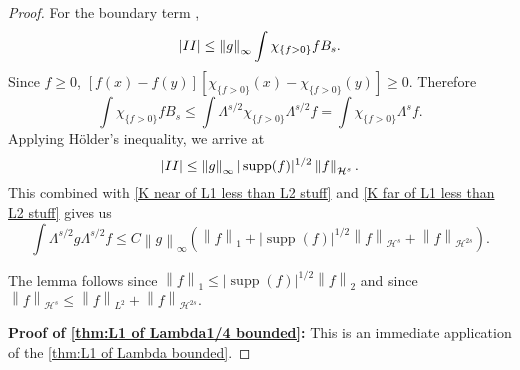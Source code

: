 \documentclass[11pt]{amsart}
\theoremstyle{remark}
\theoremstyle{definition}
\newcommand{\norm}[1]{\left\lVert#1\right\rVert}
\newcommand{\paren}[1]{\left( #1 \right)}
\newcommand{\abs}[1]{\left\lvert #1 \right\rvert}
\DeclareMathOperator{\supp}{supp}
\newcommand{\indic}[1]{\chi_{\{#1\}}}
\newcommand{\HD}{\mathcal{H}}
\newcommand{\Rom}[1]{\MakeUppercase{\romannumeral #1}}
\begin{document}
\begin{proof}
For the boundary term \Rom{2}, 
\[ \abs{\Rom{2}} \leq \norm{g}_\infty \int\indic{f>0} f B_s. \]
Since $f \geq 0$, $[f(x)-f(y)][\indic{f > 0}(x) - \indic{f > 0}(y)] \geq 0$.  Therefore
\[ \int \indic{f > 0} f B_s \leq \int \Lambda^{s/2} \indic{f>0} \Lambda^{s/2} f = \int \indic{f>0} \Lambda^{s} f. \]
Applying H\"{o}lder's inequality, we arrive at
\[ \abs{\Rom{2}} \leq \norm{g}_\infty |\supp(f)|^{1/2} \norm{f}_{\HD^{s}}. \]
This combined with \eqref{K near of L1 less than L2 stuff} and \eqref{K far of L1 less than L2 stuff} gives us 
\[ \int \Lambda^{s/2} g \Lambda^{s/2} f \leq C \norm{g}_\infty \paren{\norm{f}_1 + |\supp(f)|^{1/2} \norm{f}_{\HD^s} + \norm{f}_{\HD^{2s}}}. \]

The lemma follows since $\norm{f}_1 \leq |\supp(f)|^{1/2} \norm{f}_2$ and since $\norm{f}_{\HD^s} \leq \norm{f}_{L^2} + \norm{f}_{\HD^{2s}}$.  

\textbf{Proof of \eqref{thm:L1 of Lambda1/4 bounded}:}
This is an immediate application of the \eqref{thm:L1 of Lambda bounded}.  

\end{proof}
\end{document}
